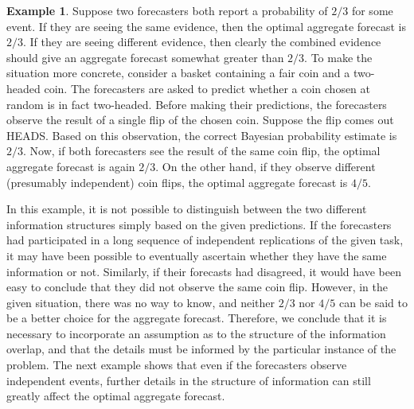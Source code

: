 \documentclass[12pt]{article}
\theoremstyle{definition}
\newtheorem{example}[theorem]{Example}
\theoremstyle{definition}
\begin{document}
\begin{example}
\label{FirstExample}
Suppose two forecasters both report a probability of $2/3$ for some
event.  If they are seeing the same evidence, then the optimal aggregate
forecast is $2/3$.  If they are seeing different evidence,
then clearly the combined evidence should give an aggregate forecast
somewhat greater than $2/3$.  To make the situation more concrete, consider a basket containing a fair coin and a two-headed coin. The forecasters are asked to predict whether a coin chosen at random is in fact
two-headed. Before making their predictions, the forecasters observe the result of a single flip of
the chosen coin.  Suppose the flip comes out HEADS. Based on this observation, the correct Bayesian probability estimate is  $2/3$.
 Now, if both forecasters see the
result of the same coin flip, the optimal aggregate forecast
 is again $2/3$. On the other hand, if they observe different (presumably
independent) coin flips, the optimal aggregate forecast 
is $4/5$.
\end{example}
In this example, it is not possible to distinguish between the two different information structures simply based on the given predictions. If the forecasters had participated in a long sequence of independent replications of the given task, it may have been possible to eventually ascertain whether they have the same information or not. Similarly, if their forecasts had disagreed, it would have been easy to conclude that they did not observe the same coin flip.  However, in the given situation, there
was no way to know, and neither $2/3$ nor $4/5$ can be said to be a
better choice for the aggregate forecast.  Therefore, we conclude that it is necessary to incorporate an assumption as to the structure of the information
overlap, and that the details must be informed by the particular
instance of the problem. The next example shows that even if the forecasters observe independent events, further details
in the structure of information can still greatly affect the
optimal aggregate forecast.
\end{document}

